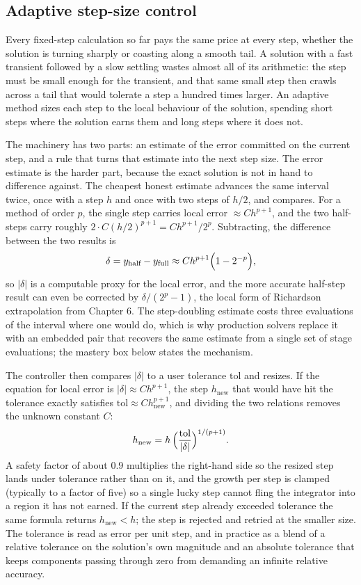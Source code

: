 \subsection{Adaptive step-size control}

Every fixed-step calculation so far pays the same price at every step,
whether the solution is turning sharply or coasting along a smooth
tail. A solution with a fast transient followed by a slow settling
wastes almost all of its arithmetic: the step must be small enough for
the transient, and that same small step then crawls across a tail that
would tolerate a step a hundred times larger. An adaptive method sizes
each step to the local behaviour of the solution, spending short steps
where the solution earns them and long steps where it does not.

The machinery has two parts: an estimate of the error committed on the
current step, and a rule that turns that estimate into the next step
size. The error estimate is the harder part, because the exact
solution is not in hand to difference against. The cheapest honest
estimate advances the same interval twice, once with a step $h$ and
once with two steps of $h/2$, and compares. For a method of order $p$,
the single step carries local error $\approx C h^{p+1}$, and the two
half-steps carry roughly $2 \cdot C (h/2)^{p+1} = C h^{p+1}/2^{p}$.
Subtracting, the difference between the two results is
\[
\delta = y_{\text{half}} - y_{\text{full}}
\approx C h^{p+1}\Bigl(1 - 2^{-p}\Bigr),
\]
so $|\delta|$ is a computable proxy for the local error, and the more
accurate half-step result can even be corrected by
$\delta/(2^{p}-1)$, the local form of Richardson extrapolation from
Chapter 6. The step-doubling estimate costs three evaluations of the
interval where one would do, which is why production solvers replace it
with an embedded pair that recovers the same estimate from a single
set of stage evaluations; the mastery box below states the mechanism.

The controller then compares $|\delta|$ to a user tolerance
$\text{tol}$ and resizes. If the equation for local error is
$|\delta| \approx C h^{p+1}$, the step $h_{\text{new}}$ that would have
hit the tolerance exactly satisfies
$\text{tol} \approx C h_{\text{new}}^{p+1}$, and dividing the two
relations removes the unknown constant $C$:
\[
h_{\text{new}} = h \, \Bigl(\frac{\text{tol}}{|\delta|}\Bigr)^{1/(p+1)}.
\]
A safety factor of about $0.9$ multiplies the right-hand side so the
resized step lands under tolerance rather than on it, and the growth
per step is clamped (typically to a factor of five) so a single lucky
step cannot fling the integrator into a region it has not earned. If
the current step already exceeded tolerance the same formula returns
$h_{\text{new}} < h$; the step is rejected and retried at the smaller
size. The tolerance is read as error per unit step, and in practice as
a blend of a relative tolerance on the solution's own magnitude and an
absolute tolerance that keeps components passing through zero from
demanding an infinite relative accuracy.

